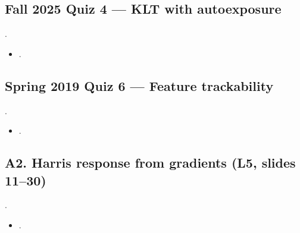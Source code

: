\documentclass[letterpaper,11pt,english,openany,oneside]{jupyterBook}
\begin{document}
\subsection{Fall 2025 Quiz 4 — KLT with auto\sphinxhyphen{}exposure}
\label{\detokenize{reference/quiz-index:fall-2025-quiz-4-klt-with-auto-exposure}}
\sphinxAtStartPar
{} .
\begin{itemize}
\item {}
\sphinxAtStartPar
{\hyperref[\detokenize{lectures/lecture05/quiz-workbook:quiz-9-q1}]{}}.

\end{itemize}


\subsection{Spring 2019 Quiz 6 — Feature trackability}
\label{\detokenize{reference/quiz-index:spring-2019-quiz-6-feature-trackability}}
\sphinxAtStartPar
{} .
\begin{itemize}
\item {}
\sphinxAtStartPar
{\hyperref[\detokenize{lectures/lecture05/quiz-workbook:quiz-13-q1}]{}}.

\end{itemize}


\subsection{A2. Harris response from gradients (L5, slides 11–30)}
\label{\detokenize{reference/quiz-index:a2-harris-response-from-gradients-l5-slides-1130}}
\sphinxAtStartPar
{} . 
\begin{itemize}
\item {}
\sphinxAtStartPar
{\hyperref[\detokenize{lectures/lecture05/quiz-workbook:quiz-a2-q1}]{}}.

\end{itemize}
\end{document}
